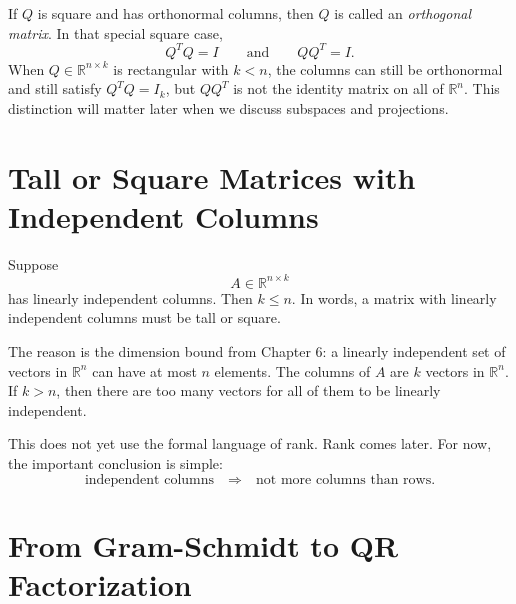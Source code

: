 If \(Q\) is square and has orthonormal columns, then \(Q\) is called an \emph{orthogonal matrix}. In that special square case,
\[
    Q^TQ=I
    \qquad \text{and} \qquad
    QQ^T=I.
\]
When \(Q\in\mathbb{R}^{n\times k}\) is rectangular with \(k<n\), the columns can still be orthonormal and still satisfy \(Q^TQ=I_k\), but \(QQ^T\) is not the identity matrix on all of \(\mathbb{R}^n\). This distinction will matter later when we discuss subspaces and projections.

\section{Tall or Square Matrices with Independent Columns}
\label{mf:tall-or-square-independent-columns}

Suppose
\[
    A\in\mathbb{R}^{n\times k}
\]
has linearly independent columns. Then \(k\leq n\). In words, a matrix with linearly independent columns must be tall or square.

The reason is the dimension bound from Chapter 6: a linearly independent set of vectors in \(\mathbb{R}^n\) can have at most \(n\) elements. The columns of \(A\) are \(k\) vectors in \(\mathbb{R}^n\). If \(k>n\), then there are too many vectors for all of them to be linearly independent.

This does not yet use the formal language of rank. Rank comes later. For now, the important conclusion is simple:
\[
    \text{independent columns} \quad \Rightarrow \quad \text{not more columns than rows.}
\]

\section{From Gram-Schmidt to QR Factorization}
\label{mf:qr-factorization}

